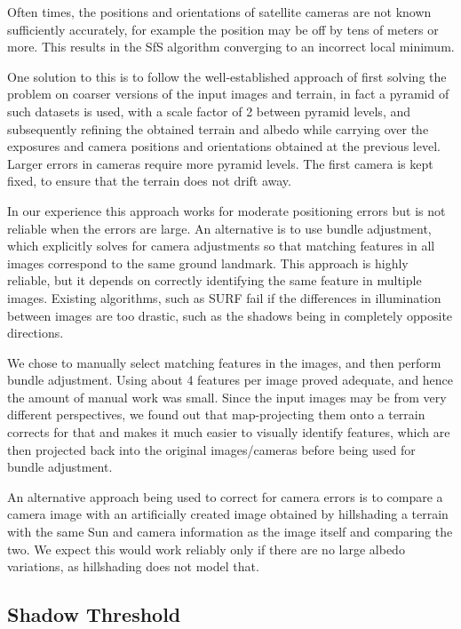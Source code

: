\documentclass[12pt,oneside]{article}
\begin{document}
Often times, the positions and orientations of satellite cameras
are not known sufficiently accurately, for example the position may be off by tens of meters or more.
This results in the SfS algorithm converging to an incorrect local minimum. 

One solution to this is to follow the well-established approach 
of first solving the problem on coarser versions of the input
images and terrain, in fact a pyramid of such datasets is used, with a
scale factor of 2 between pyramid levels, and subsequently refining the
obtained terrain and albedo while carrying over the exposures and camera
positions and orientations obtained at the previous level. Larger errors
in cameras require more pyramid levels. The first camera is kept fixed,
to ensure that the terrain does not drift away.

In our experience this approach works for moderate positioning errors but is not 
reliable when the errors are large. An alternative is to use bundle adjustment,
which explicitly solves for camera adjustments so that matching features in
all images correspond to the same ground landmark. This approach is highly 
reliable, but it depends on correctly identifying the same feature in multiple images.
Existing algorithms, such as SURF fail if the differences in illumination between
images are too drastic, such as the shadows being in completely opposite directions.

We chose to manually select matching features in the images, and then perform
bundle adjustment. Using about 4 features per image proved adequate, and hence
the amount of manual work was small. Since the input images may be from very different
perspectives, we found out that map-projecting them onto a terrain corrects for that
and makes it much easier to visually identify features, which are then projected
back into the original images/cameras before being used for bundle adjustment.

An alternative approach being used to correct for camera errors is to compare a 
camera image with an artificially created image obtained by hillshading a terrain
with the same Sun and camera information as the image itself and comparing the two.
We expect this would work reliably only if there are no large albedo variations,
as hillshading does not model that. 

\subsection{Shadow Threshold}
\label{shadow}
\end{document}
